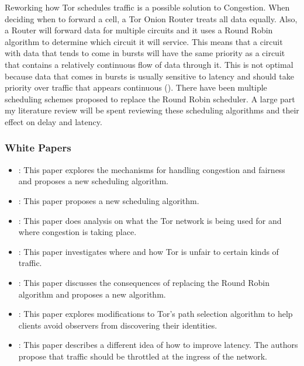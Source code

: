 \documentclass[letterpaper,12pt]{texMemo}
\begin{document}
    Reworking how Tor schedules traffic is a possible solution to Congestion. When deciding when to
    forward a cell, a Tor Onion Router treats all data equally. Also, a Router will forward data for
    multiple circuits and it uses a Round Robin algorithm to determine which circuit it will
    service. This means that a circuit with data that tends to come in bursts will have the same
    priority as a circuit that contains a relatively continuous flow of data through it. This is not
    optimal because data that comes in bursts is usually sensitive to latency and should take
    priority over traffic that appears continuous (\citeauthor[2]{unfair}). There have been
    multiple scheduling schemes proposed to replace the Round Robin scheduler. A large part my literature
    review will be spent reviewing these scheduling algorithms and their effect on delay and latency.

\subsubsection*{White Papers}
\begin{itemize}
    \item
    \citeauthor*{unfair}: This paper explores the mechanisms for handling congestion
    and fairness and proposes a new scheduling algorithm.
    \item
    \citeauthor*{Tang}: This paper proposes a new scheduling algorithm.
    \item
    \citeauthor*{analysis}: This paper does analysis on what the Tor network is being used for and where congestion is taking place.
    \item
    \citeauthor*{delay}: This paper investigates where and how Tor is unfair to certain kinds of traffic.
    \item
    \citeauthor*{Bauer}: This paper discusses the consequences of replacing the Round Robin algorithm and
    proposes a new algorithm.
    \item
    \citeauthor*{Edman}: This paper explores modifications to Tor's path selection algorithm to help
    clients avoid observers from discovering their identities.
    \item
    \citeauthor*{Moore}: This paper describes a different idea of how to improve latency. The
    authors propose that traffic should be throttled at the ingress of the network.

\end{itemize}
\end{document}
